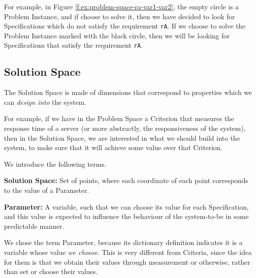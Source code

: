 \documentclass[graybox]{svmult}
\newcommand{\zi}[1]{\textit{#1}}
\newcommand{\xb}[1]{\textbf{#1}}
\newcommand{\xt}[1]{\texttt{#1}}
\newcommand{\req}[1]{\xt{#1}}
\newcommand{\SolutionSpace}{Solution Space}
\newcommand{\ProblemSpace}{Problem Space}
\newcommand{\Specification}{Specification}
\newcommand{\Criterion}{Criterion}
\newcommand{\Criteria}{Criteria}
\newcommand{\ProblemInstance}{Problem Instance}
\newcommand{\Parameter}{Parameter}
\begin{document}
For example, in Figure \ref{f:ex:problem-space-ra-var1-var2}, the empty circle is a \ProblemInstance, and if choose to solve it, then we have decided to look for \Specification s which do not satisfy the requirement \req{rA}. If we choose to solve the \ProblemInstance{} marked with the black circle, then we will be looking for \Specification s that satisfy the requirement \req{rA}.


%
\subsection{\SolutionSpace}\label{s:spaces:solution-space}
The \SolutionSpace{} is made of dimensions that correspond to properties which we can \zi{design into} the system. 

For example, if we have in the \ProblemSpace{} a \Criterion{} that measures the response time of a server (or more abstractly, the responsiveness of the system), then in the \SolutionSpace, we are interested in what we should build into the system, to make sure that it will achieve some value over that \Criterion. 

We introduce the following terms.

\begin{definition}\label{d:solution-space}
\xb{\SolutionSpace:} Set of points, where each coordinate of each point corresponds to the value of a \Parameter.
\end{definition}

\begin{definition}\label{d:parameter}
\xb{\Parameter:} A variable, such that we can choose its value for each \Specification, and this value is expected to influence the behaviour of the system-to-be in some predictable manner.
\end{definition}

We chose the term \Parameter, because its dictionary definition indicates it is a variable whose value \zi{we choose}. This is very different from \Criteria, since the idea for them is that we obtain their values through measurement or otherwise,  rather than set or choose their values.
\end{document}
